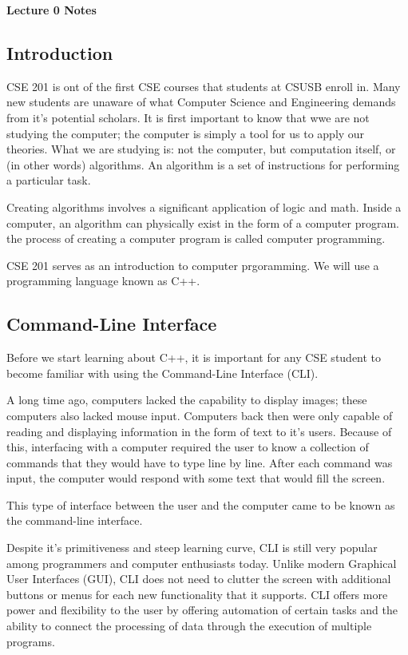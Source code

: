 \documentclass[a4paper,12pt]{article}
\begin{document}
\lstset{basicstyle=\ttfamily,tabsize=4}

{\centering \bf \Large
Lecture 0 Notes \\
}

\subsection*{Introduction}

CSE 201 is ont of the first CSE courses that students at CSUSB enroll in. Many new students are unaware of what Computer Science and Engineering demands from it's potential scholars. It is first important to know that wwe are not studying the computer; the computer is simply a tool for us to apply our theories. What we are studying is: not the computer, but computation itself, or (in other words) algorithms. An algorithm is a set of instructions for performing a particular task.

Creating algorithms involves a significant application of logic and math. Inside a computer, an algorithm can physically exist in the form of a computer program. the process of creating a computer program is called computer programming.

CSE 201 serves as an introduction to computer prgoramming. We will use a programming language known as C++. 

\subsection*{Command-Line Interface}

Before we start learning about C++, it is important for any CSE student to become familiar with using the Command-Line Interface (CLI). 

A long time ago, computers lacked the capability to display images; these computers also lacked mouse input. Computers back then were only capable of reading and displaying information in the form of text to it's users. Because of this, interfacing with a computer required the user to know a collection of commands that they would have to type line by line. After each command was input, the computer would respond with some text that would fill the screen. 

This type of interface between the user and the computer came to be known as the command-line interface.

Despite it's primitiveness and steep learning curve, CLI is still very popular among programmers and computer enthusiasts today. Unlike modern Graphical User Interfaces (GUI), CLI does not need to clutter the screen with additional buttons or menus for each new functionality that it supports. CLI offers more power and flexibility to the user by offering automation of certain tasks and the ability to connect the processing of data through the execution of multiple programs.
\end{document}
